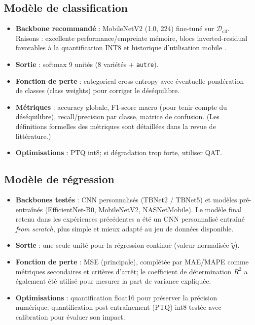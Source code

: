 \subsection{Modèle de classification}

\begin{itemize}
	\item \textbf{Backbone recommandé} : MobileNetV2 (1.0, 224) fine-tuné sur \(\mathcal{D}_{\text{clf}}\). Raisons : excellente performance/empreinte mémoire, blocs inverted-residual favorables à la quantification INT8 et historique d'utilisation mobile \cite{sandler2018mobilenetv2}.
	\item \textbf{Sortie} : softmax 9 unités (8 variétés + \texttt{autre}).
	\item \textbf{Fonction de perte} : categorical cross-entropy avec éventuelle pondération de classes (class weights) pour corriger le déséquilibre.
	\item \textbf{Métriques} : accuracy globale, F1-score macro (pour tenir compte du déséquilibre), recall/precision par classe, matrice de confusion. (Les définitions formelles des métriques sont détaillées dans la revue de littérature.)
	\item \textbf{Optimisations} : PTQ int8; si dégradation trop forte, utiliser QAT.
\end{itemize}

\subsection{Modèle de régression}

\begin{itemize}
	\item \textbf{Backbones testés} : CNN personnalisés (TBNet2 / TBNet5) et modèles pré-entraînés (EfficientNet-B0, MobileNetV2, NASNetMobile). Le modèle final retenu dans les expériences précédentes a été un CNN personnalisé entraîné \emph{from scratch}, plus simple et mieux adapté au jeu de données disponible.
	\item \textbf{Sortie} : une seule unité pour la régression continue (valeur normalisée $\tilde{y}$).
	\item \textbf{Fonction de perte} : MSE (principale), complétée par MAE/MAPE comme métriques secondaires et critères d’arrêt; le coefficient de détermination \(R^2\) a également été utilisé pour mesurer la part de variance expliquée.
	\item \textbf{Optimisations} : quantification float16 pour préserver la précision numérique; quantification post-entraînement (PTQ) int8 testée avec calibration pour évaluer son impact.
\end{itemize}

